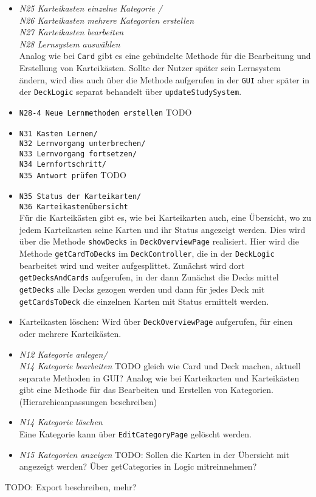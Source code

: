 \documentclass[fontsize=12pt,paper=A4,twoside]{scrartcl}
\begin{document}
    \begin{itemize}
    \item\textit{N25 Karteikasten einzelne Kategorie / \\
    N26 Karteikasten mehrere Kategorien erstellen\\
    N27 Karteikasten bearbeiten\\
    N28 Lernsystem auswählen}\\
    Analog wie bei \texttt{Card} gibt es eine gebündelte Methode für die Bearbeitung und Erstellung von Karteikästen.
    Sollte der Nutzer später sein Lernsystem ändern, wird dies auch über die Methode aufgerufen in der \texttt{GUI} aber später in der \texttt{DeckLogic}
    separat behandelt über \texttt{updateStudySystem}.
    \item \texttt{N28-4 Neue Lernmethoden erstellen} TODO
    \item \texttt{N31 Kasten Lernen/ \\N32 Lernvorgang unterbrechen/ \\N33 Lernvorgang fortsetzen/ \\N34 Lernfortschritt/ \\N35 Antwort prüfen} TODO
    \item \texttt{N35 Status der Karteikarten/ \\ N36 Karteikastenübersicht}\\ 
    Für die Karteikästen gibt es, wie bei Karteikarten auch, eine Übersicht, wo zu jedem Karteikasten seine Karten und ihr Status angezeigt werden.
    Dies wird über die Methode \texttt{showDecks} in \texttt{DeckOverviewPage} realisiert. Hier wird die Methode \texttt{getCardToDecks} im \texttt{DeckController}, 
    die in der \texttt{DeckLogic} bearbeitet wird und weiter aufgesplittet. Zunächst wird dort \texttt{getDecksAndCards} aufgerufen, in der dann Zunächst
    die Decks mittel \texttt{getDecks} alle Decks gezogen werden und dann für jedes Deck mit \texttt{getCardsToDeck} die einzelnen Karten mit Status
    ermittelt werden.
    \item Karteikasten löschen: Wird über \texttt{DeckOverviewPage} aufgerufen, für einen oder mehrere Karteikästen.
    \end{itemize}
    \begin{itemize}
        \item \textit{N12 Kategorie anlegen/ \\ N14 Kategorie bearbeiten} TODO gleich wie Card und Deck machen, aktuell separate Methoden in GUI? 
    Analog wie bei Karteikarten und Karteikästen gibt eine Methode für das Bearbeiten und Erstellen von Kategorien. (Hierarchieanpassungen beschreiben)
        \item \textit{N14 Kategorie löschen}\\
    Eine Kategorie kann über \texttt{EditCategoryPage} gelöscht werden.
    \item \textit{N15 Kategorien anzeigen} TODO: Sollen die Karten in der Übersicht mit angezeigt werden? Über getCategories in Logic mitreinnehmen?\\
    \end{itemize}
    TODO: Export beschreiben, mehr?
    
\end{document}
